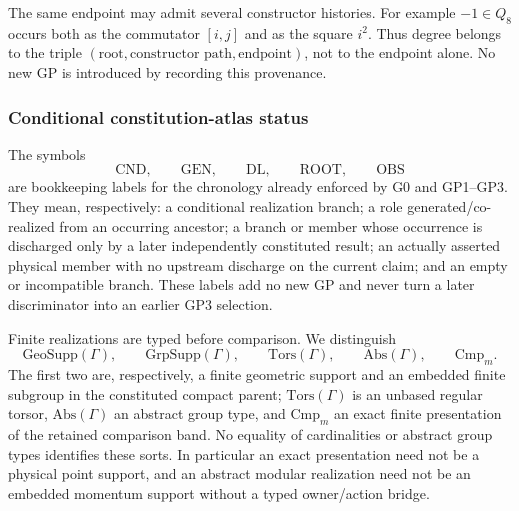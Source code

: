 \documentclass[12pt,a4paper]{article}
\begin{document}
\begin{remark}
\label{p2a:rem:v189-endpoint-degree-firewall}
The same endpoint may admit several constructor histories.  For example
$-1\in Q_8$ occurs both as the commutator $[i,j]$ and as the square $i^2$.
Thus degree belongs to the triple
$(\text{root},\text{constructor path},\text{endpoint})$, not to the endpoint
alone.  No new GP is introduced by recording this provenance.
\end{remark}


\subsubsection{Conditional constitution-atlas status}
\label{p2a:subsec:v236-constitution-atlas}

\begin{definition}
\label{p2a:def:v236-atlas-status}
The symbols
\[
 \mathrm{CND},\qquad \mathrm{GEN},\qquad \mathrm{DL},\qquad
 \mathrm{ROOT},\qquad \mathrm{OBS}
\]
are bookkeeping labels for the chronology already enforced by G0 and
GP1--GP3.  They mean, respectively: a conditional realization branch; a
role generated/co-realized from an occurring ancestor; a branch or member
whose occurrence is discharged only by a later independently constituted
result; an actually asserted physical member with no upstream discharge on
the current claim; and an empty or incompatible branch.  These labels add no
new GP and never turn a later discriminator into an earlier GP3 selection.
\end{definition}

\begin{definition}
\label{p2a:def:v236-finite-output-types}
Finite realizations are typed before comparison.  We distinguish
\[
 \mathrm{GeoSupp}(\Gamma),\qquad
 \mathrm{GrpSupp}(\Gamma),\qquad
 \mathrm{Tors}(\Gamma),\qquad
 \mathrm{Abs}(\Gamma),\qquad
 \mathrm{Cmp}_m.
\]
The first two are, respectively, a finite geometric support and an embedded
finite subgroup in the constituted compact parent; \(\mathrm{Tors}(\Gamma)\)
is an unbased regular torsor, \(\mathrm{Abs}(\Gamma)\) an abstract group type,
and \(\mathrm{Cmp}_m\) an exact finite presentation of the retained
comparison band.  No equality of cardinalities or abstract group types
identifies these sorts.  In particular an exact presentation need not be a
physical point support, and an abstract modular realization need not be an
embedded momentum support without a typed owner/action bridge.
\end{definition}
\end{document}
